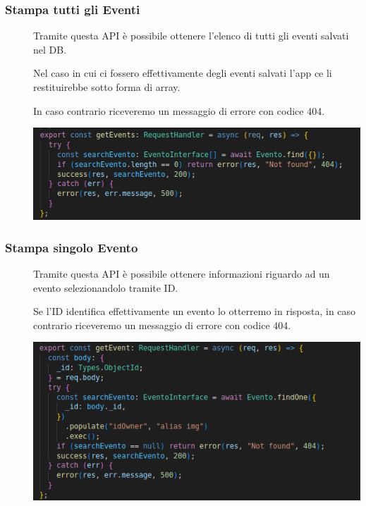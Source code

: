 \documentclass{article}
\begin{document}
\subsubsection{Stampa tutti gli Eventi}
\begin{description}
    \item[] Tramite questa API è possibile ottenere l'elenco di tutti gli eventi salvati nel DB.
    \item[] Nel caso in cui ci fossero effettivamente degli eventi salvati l'app ce li restituirebbe sotto forma di array.
    \item[] In caso contrario riceveremo un messaggio di errore con codice 404.
    \item[] \begin{center}
            \includegraphics[scale=0.5]{allEvent.png}
        \end{center}
\end{description}
\clearpage
\subsubsection{Stampa singolo Evento}
\begin{description}
    \item[] Tramite questa API è possibile ottenere informazioni riguardo ad un evento selezionandolo tramite ID.
    \item[] Se l'ID identifica effettivamente un evento lo otterremo in risposta, in caso contrario riceveremo un messaggio di errore con codice 404.
    \item[] \begin{center}
            \includegraphics[scale=0.5]{getEvent.png}
        \end{center}
\end{description}
\end{document}
